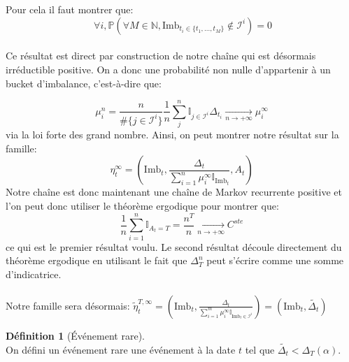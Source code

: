 \documentclass[12pt,a4paper]{article}
\theoremstyle{definition}
\newtheorem{definition}[theorem]{Définition}
\theoremstyle{remark}
\begin{document}
\\
\\
Pour cela il faut montrer que:
$$ \ \forall i,  \mathbb{P}\left(\forall M \in \mathbb{N}, \text{Imb}_{t_i\in\{t_1,\dots,t_M\}}\notin \mathcal{I}^{i}\right) = 0$$
\\
Ce résultat est direct par construction de notre chaîne qui est désormais irréductible positive. On a donc une probabilité non nulle d'appartenir à un bucket d'imbalance, c'est-à-dire que:

$$\mu_i^n = \frac{n}{\#\{j\in \mathcal I^i\}}\frac{1}{n}\sum_{j}^n\mathbb{I}_{j\in \mathcal I^i}\Delta_{t_i}\underset{n\to+\infty}{\to}\mu_i^{\infty}$$
via la loi forte des grand nombre. Ainsi, on peut montrer notre résultat sur la famille:
$$\eta_t^{\infty} = \left(\text{Imb}_t, \frac{\Delta_t}{\sum_{i=1}^n\mu_i^{\infty}\mathbb{I}_{\text{Imb}_t}}, A_t\right)$$
Notre chaîne est donc maintenant une chaîne de Markov recurrente positive et l'on peut donc utiliser le théorème ergodique pour montrer que:
$$\frac{1}{n}\sum_{i=1}^n\mathbb{I}_{A_t=T} = \frac{n^T}{n} \underset{n\to+\infty}{\to} C^{ste}$$
ce qui est le premier résultat voulu. Le second résultat découle directement du théorème ergodique en utilisant le fait que $\Delta_T^n$ peut s'écrire comme une somme d'indicatrice. 
\\
\\
Notre famille sera désormais: 
$\tilde \eta_t^{T,\infty} = \left(\text{Imb}_t, \frac{\Delta_t}{\sum_{i=1}^m\mu_i^{\infty}\mathbb{I}_{\text{Imb}_t\in\mathcal{I}^{i}}}\right)=\left(\text{Imb}_t, \tilde{\Delta_t}\right)$
\\
\begin{definition}[Événement rare]
\\
On défini un événement rare une événement à la date $t$ tel que $\tilde{\Delta_t}<\Delta_T(\alpha)$.
    
\end{definition}
\end{document}

